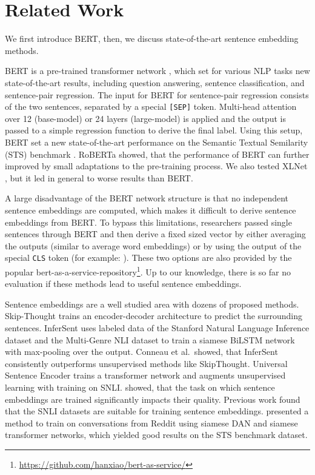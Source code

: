 \documentclass[11pt,a4paper]{article}
\begin{document}
\section{Related Work}
We first introduce BERT, then, we discuss state-of-the-art sentence embedding methods.

BERT \cite{devlin2018bert} is a pre-trained transformer network \cite{Attention_is_all_you_need}, which set for various NLP tasks new state-of-the-art results, including question answering, sentence classification, and sentence-pair regression. The input for BERT for sentence-pair regression consists of the two sentences, separated by a special \texttt{[SEP]} token. Multi-head attention over 12 (base-model) or 24 layers (large-model) is applied and the output is passed to a simple regression function to derive the final label. Using this setup, BERT set a new state-of-the-art performance on the Semantic Textual Semilarity (STS) benchmark \cite{sts2017}. RoBERTa \cite{roberta} showed, that the performance of BERT can further improved by small adaptations to the pre-training process. We also tested XLNet \cite{xlnet}, but it led in general to worse results than BERT. 

A large disadvantage of the BERT network structure is that no independent sentence embeddings are computed, which makes it difficult to derive sentence embeddings from BERT. To bypass this limitations, researchers passed single sentences through BERT and then derive a fixed sized vector by either averaging the outputs (similar to average word embeddings) or by using the output of the special \texttt{CLS} token (for example: ). These two options are also provided by the popular bert-as-a-service-repository\footnote{\url{https://github.com/hanxiao/bert-as-service/}}. Up to our knowledge, there is so far no evaluation if these methods lead to useful sentence embeddings.

Sentence embeddings are a well studied area with dozens of proposed methods. Skip-Thought \cite{SkipThought} trains an encoder-decoder architecture to predict the surrounding sentences. InferSent \cite{conneau2017infersent} uses labeled data of the Stanford Natural Language Inference dataset \cite{snli} and the Multi-Genre NLI dataset \cite{multinli} to train a siamese BiLSTM network with max-pooling over the output. Conneau et al.\ showed, that InferSent consistently outperforms unsupervised methods like SkipThought.  Universal Sentence Encoder \cite{universal_sentence_encoder} trains a transformer network and augments unsupervised learning with training on SNLI.  showed, that the task on which sentence embeddings are trained significantly impacts their quality.  Previous work \cite{conneau2017infersent, universal_sentence_encoder}  found that the SNLI datasets are suitable for training sentence embeddings.  presented a method to train on conversations from Reddit using siamese DAN and siamese transformer networks, which yielded good results on the STS benchmark dataset.
\end{document}
